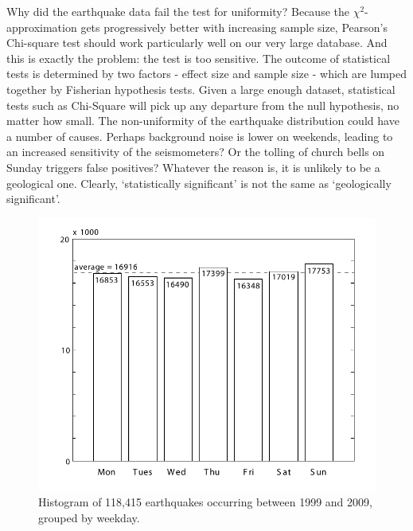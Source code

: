 \documentclass{article}
\begin{document}
Why did the earthquake data fail the test for uniformity? Because the
$\chi^2$-approximation gets progressively better with increasing
sample size, Pearson's Chi-square test should work particularly well
on our very large database. And this is exactly the problem: the test
is too sensitive. The outcome of statistical tests is determined by
two factors - effect size and sample size - which are lumped together
by Fisherian hypothesis tests.  Given a large enough dataset,
statistical tests such as Chi-Square will pick up any departure from
the null hypothesis, no matter how small. The non-uniformity of the
earthquake distribution could have a number of causes.  Perhaps
background noise is lower on weekends, leading to an increased
sensitivity of the seismometers? Or the tolling of church bells on
Sunday triggers false positives?  Whatever the reason is, it is
unlikely to be a geological one.  Clearly, `statistically significant'
is not the same as `geologically significant'.

 

\clearpage

\begin{figure}[h]
  \centering
\includegraphics[width=\textwidth]{histogram-1999-2009.pdf}  
  \caption{Histogram of 118,415 earthquakes occurring between 1999
    and 2009, grouped by weekday.}
  \label{fig:1}
\end{figure}
\end{document}
